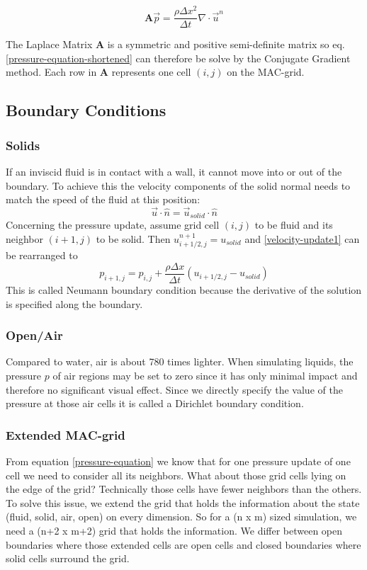 \begin{equation} \label{pressure-equation-shortened}
	\mathbf{A}\vec{p} = \frac{\rho \Delta x^2}{\Delta t}\nabla \cdot \vec{u}^n
\end{equation}

The Laplace Matrix $\mathbf{A}$ is a symmetric and positive semi-definite matrix so eq. \ref{pressure-equation-shortened} can therefore be solve by the Conjugate Gradient method. Each row in \textbf{A} represents one cell $(i, j)$ on the MAC-grid. 


\subsection{Boundary Conditions}
\subsubsection{Solids}
If an inviscid fluid is in contact with a wall, it cannot move into or out of the boundary. To achieve this the velocity components of the solid normal needs to match the speed of the fluid at this position:
\begin{equation} \label{navier-stokes12}
    \vec{u} \cdot \hat{n} = \vec{u}_{solid} \cdot \hat{n}
\end{equation}
Concerning the pressure update, assume grid cell $(i,j)$ to be fluid and its neighbor $(i+1,j)$ to be solid. Then $u_{i+1/2,j}^{n+1} = u_{solid}$ and \ref{velocity-update1} can be rearranged to 
\begin{equation} \label{navier-stokes12}
    p_{i+1,j} = p_{i,j} + \frac{\rho \Delta x}{\Delta t} (u_{i+1/2,j} - u_{solid})
\end{equation}
This is called Neumann boundary condition because the derivative of the solution is specified along the boundary.
\newpage
\subsubsection{Open/Air} \label{dirichlet}
Compared to water, air is about 780 times lighter. When simulating liquids, the pressure $p$ of air regions may be set to zero since it has only minimal impact and therefore no significant visual effect. Since we directly specify the value of the pressure at those air cells it is called a Dirichlet boundary condition.


\subsubsection{Extended MAC-grid}
From equation \ref{pressure-equation} we know that for one pressure update of one cell we need to consider all its neighbors. What about those grid cells lying on the edge of the grid? Technically those cells have fewer neighbors than the others. To solve this issue, we extend the grid that holds the information about the state (fluid, solid, air, open) on every dimension. So for a (n x m) sized simulation, we need a (n+2 x m+2) grid that holds the information. We differ between open boundaries where those extended cells are open cells and closed boundaries where solid cells surround the grid.

